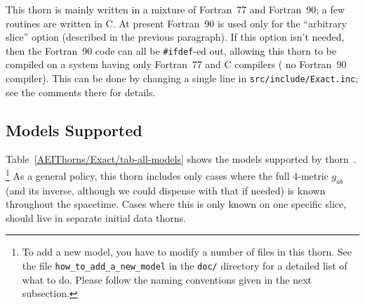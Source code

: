 This thorn is mainly written in a mixture of Fortran~77 and Fortran~90;
a few routines are written in C.  At present Fortran~90 is used only
for the ``arbitrary slice'' option (described in the previous paragraph).
If this option isn't needed, then the Fortran~90 code can all be
\verb|#ifdef|-ed out, allowing this thorn to be compiled on a system
having only Fortran~77 and C compilers (\ie{} no Fortran~90 compiler).
This can be done by changing a single line in \verb|src/include/Exact.inc|;
see the comments there for details.


\subsection{Models Supported}

Table~\ref{AEIThorns/Exact/tab-all-models} shows the models supported
by thorn~.%
\footnote{%
	 To add a new model, you have to modify a
	 number of files in this thorn.  See the file
	 {\tt how\_to\_add\_a\_new\_model} in the
	 {\tt doc/} directory for a detailed list of
	 what to do.  Please follow the naming conventions
	 given in the next subsection.
	 }%
{}  As a general policy, this thorn includes only cases where the full
4-metric $g_{ab}$ (and its inverse, although we could dispense with
that if needed) is known throughout the spacetime.  Cases where this
is only known on one specific slice, should live in separate initial
data thorns.

